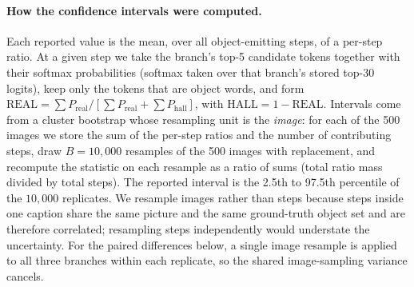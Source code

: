 
\paragraph{How the confidence intervals were computed.} Each reported value is
the mean, over all object-emitting steps, of a per-step ratio. At a given step we
take the branch's top-5 candidate tokens together with their softmax
probabilities (softmax taken over that branch's stored top-30 logits), keep only
the tokens that are object words, and form
$\mathrm{REAL} = \sum P_{\mathrm{real}} / \left[\sum P_{\mathrm{real}} + \sum P_{\mathrm{hall}}\right]$,
with $\mathrm{HALL} = 1 - \mathrm{REAL}$. Intervals come from a cluster bootstrap
whose resampling unit is the \emph{image}: for each of the 500 images we store the
sum of the per-step ratios and the number of contributing steps, draw $B=10{,}000$
resamples of the 500 images with replacement, and recompute the statistic on each
resample as a ratio of sums (total ratio mass divided by total steps). The
reported interval is the 2.5th to 97.5th percentile of the $10{,}000$ replicates.
We resample images rather than steps because steps inside one caption share the
same picture and the same ground-truth object set and are therefore correlated;
resampling steps independently would understate the uncertainty. For the paired
differences below, a single image resample is applied to all three branches
within each replicate, so the shared image-sampling variance cancels.

